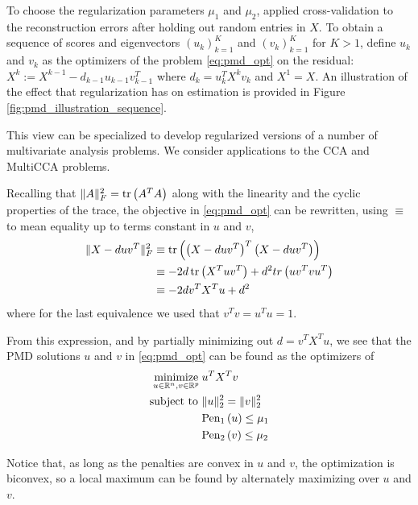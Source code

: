 \documentclass[14pt]{extarticle}
\begin{document}
To choose the regularization parameters $\mu_{1}$ and $\mu_{2}$,
\citep{witten2009penalized} applied cross-validation to the reconstruction
errors after holding out random entries in $X$. To obtain a sequence of scores
and eigenvectors $\left(u_{k}\right)_{k = 1}^{K}$ and $\left(v_{k}\right)_{k =
  1}^{K}$ for $K > 1$, define $u_{k}$ and $v_{k}$ as the optimizers of the
problem \ref{eq:pmd_opt} on the residual: $X^{k} := X^{k - 1} - d_{k - 1}u_{k -
  1}v_{k - 1}^{T}$ where $d_{k} = u_{k}^{T} X^{k}v_{k}$ and $X^{1} = X$. An
illustration of the effect that regularization has on estimation is provided in
Figure \ref{fig:pmd_illustration_sequence}.


This view can be specialized to develop regularized versions of a number of
multivariate analysis problems. We consider applications to the CCA and
MultiCCA problems.

Recalling that $\|A\|_{F}^{2} = \mathop\mathrm{tr}\left(A^{T}A\right)$ along with the linearity
and the cyclic properties of the trace, the objective in \ref{eq:pmd_opt} can be
rewritten, using $\equiv$ to mean equality up to terms constant in $u$ and $v$,
\begin{align*}
  \|X - duv^{T}\|_{F}^{2} &\equiv \mathop\mathrm{tr}\left(\left(X -
      duv^{T}\right)^{T}\left(X - duv^{T}\right)\right) \\
  &\equiv -2d\mathop\mathrm{tr}\left(X^{T}uv^{T}\right) + d^{2}tr\left(uv^{T}vu^{T}\right) \\
  &\equiv -2d v^{T}X^{T}u + d^{2}
\end{align*}
where for the last equivalence we used that $v^{T}v = u^{T}u = 1$.

From this expression, and by partially minimizing out $d = v^{T}X^{T}u$, we see
that the PMD solutions $u$ and $v$ in \ref{eq:pmd_opt} can be found as the
optimizers of
\begin{align}
\label{eq:pmd_reform}  \mathop\mathrm{minimize}_{u \in \mathbb{R}^{n}, v \in \mathbb{R}^{p}} \medspace &u^{T}X^{T}v \\
  \text{subject to } &\|u\|_{2}^{2} = \|v\|_{2}^{2} \nonumber \\
  &\text{Pen}_{1}\left(u\right) \leq \mu_{1}\nonumber \\
  &\text{Pen}_{2}\left(v\right) \leq \mu_{2} \nonumber
\end{align}

Notice that, as long as the penalties are convex in $u$ and $v$, the
optimization is biconvex, so a local maximum can be found by
alternately maximizing over $u$ and $v$.
\end{document}
